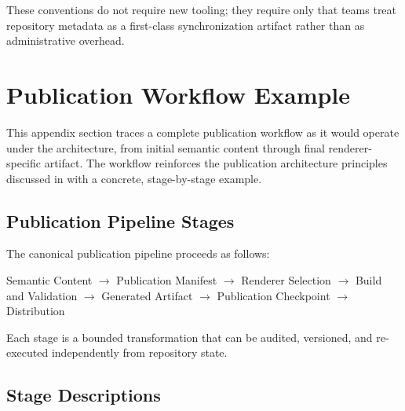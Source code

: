 These conventions do not require new tooling; they require only that teams treat repository metadata as a first-class synchronization artifact rather than as administrative overhead.


\section{Publication Workflow Example}
\label{sec:appendix-publication}

This appendix section traces a complete publication workflow as it would operate under the  architecture, from initial semantic content through final renderer-specific artifact. The workflow reinforces the publication architecture principles discussed in  with a concrete, stage-by-stage example.

\subsection{Publication Pipeline Stages}

The canonical  publication pipeline proceeds as follows:

\begin{center}
Semantic Content
$\rightarrow$ Publication Manifest
$\rightarrow$ Renderer Selection
$\rightarrow$ Build and Validation
$\rightarrow$ Generated Artifact
$\rightarrow$ Publication Checkpoint
$\rightarrow$ Distribution
\end{center}

Each stage is a bounded transformation that can be audited, versioned, and re-executed independently from repository state.

\subsection{Stage Descriptions}

